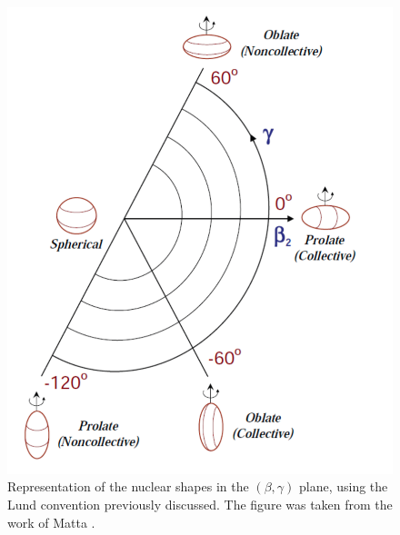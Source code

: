 \begin{figure}
    \centering
    \includegraphics[scale=0.3]{Chapters/Figures/lund-convention-plot.pdf}
    \caption{Representation of the nuclear shapes in the $(\beta,\gamma)$ plane, using the Lund convention \cite{andersson1976nuclear} previously discussed. The figure was taken from the work of Matta \cite{matta2017exotic}.}
    \label{lund-convention-graph}
\end{figure}


